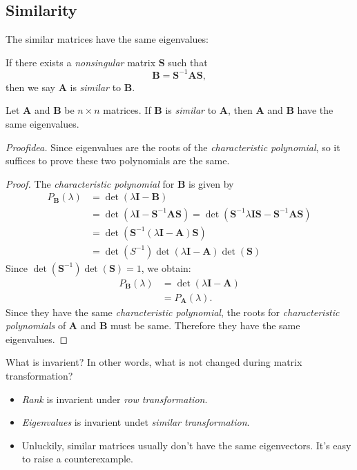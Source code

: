 \subsection{Similarity}
The similar matrices have the same eigenvalues:
\begin{definition}[Similar]
If there exists a \textit{nonsingular} matrix $\bm S$ such that
\[
\bm B=\bm S^{-1}\bm A\bm S,
\]
then we say $\bm A$ is \emph{similar} to $\bm B$.
\end{definition}
\begin{proposition}\label{proposition_15.1}
Let $\bm A$ and $\bm B$ be $n\times n$ matrices. If $\bm B$ is \textit{similar} to $\bm A$, then $\bm A$ and $\bm B$ have the same eigenvalues.
\end{proposition}
\textit{Proofidea.} Since eigenvalues are the roots of the \textit{characteristic polynomial}, so it suffices to prove these two polynomials are the same.
\begin{proof}
The \textit{characteristic polynomial} for $\bm B$ is given by
\begin{align*}
P_{\bm B}(\lambda)&=\det(\lambda\bm I-\bm B)\\
&=\det(\lambda\bm I-\bm S^{-1}\bm A\bm S)=\det(\bm S^{-1}\lambda\bm I\bm S-\bm S^{-1}\bm A\bm S)\\
&=\det(\bm S^{-1}(\lambda\bm I-\bm A)\bm S)\\
&=\det(S^{-1})\det(\lambda\bm I-\bm A)\det(\bm S)
\end{align*}
Since $\det(\bm S^{-1})\det(\bm S)=1$, we obtain:
\begin{align*}
P_{\bm B}(\lambda)&=\det(\lambda\bm I-\bm A)\\
&=P_{\bm A}(\lambda).
\end{align*}
Since they have the same \textit{characteristic polynomial}, the roots for \textit{characteristic polynomials} of $\bm A$ and $\bm B$ must be same. Therefore they have the same eigenvalues.
\end{proof}
\begin{remark}
What is invarient? In other words, what is not changed during matrix transformation?
\begin{itemize}
\item
\emph{Rank} is invarient under \textit{row transformation}.
\item
\emph{Eigenvalues} is invarient undet \textit{similar transformation}.
\item
Unluckily, similar matrices usually don't have the same eigenvectors. It's easy to raise a counterexample.
\end{itemize}
\end{remark}
